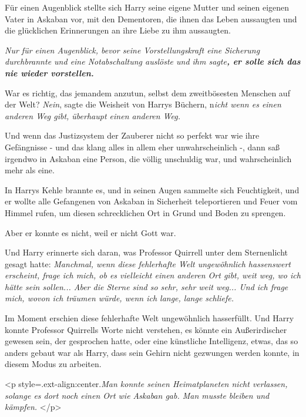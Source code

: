 Für einen Augenblick stellte sich Harry seine eigene Mutter und seinen eigenen
Vater in Askaban vor, mit den Dementoren, die ihnen das Leben aussaugten und die
glücklichen Erinnerungen an ihre Liebe zu ihm aussaugten.

\textbf{} \emph{Nur für einen Augenblick, bevor seine Vorstellungskraft eine
Sicherung durchbrannte und eine Notabschaltung auslöste und ihm
sagte}\textbf{\emph{, er solle sich das nie wieder vorstellen.}}

War es richtig, das jemandem anzutun, selbst dem zweitbösesten Menschen auf der
Welt? \emph{Nein}, sagte die Weisheit von Harrys Büchern, n\emph{icht wenn es
einen anderen Weg gibt, überhaupt einen anderen Weg.}

Und wenn das Justizsystem der Zauberer nicht so perfekt war wie ihre Gefängnisse
- und das klang alles in allem eher unwahrscheinlich -, dann saß irgendwo in
Askaban eine Person, die völlig unschuldig war, und wahrscheinlich mehr als
eine.

In Harrys Kehle brannte es, und in seinen Augen sammelte sich Feuchtigkeit, und
er wollte alle Gefangenen von Askaban in Sicherheit teleportieren und Feuer vom
Himmel rufen, um diesen schrecklichen Ort in Grund und Boden zu sprengen.

Aber er konnte es nicht, weil er nicht Gott war.

Und Harry erinnerte sich daran, was Professor Quirrell unter dem Sternenlicht
gesagt hatte: \emph{Manchmal, wenn diese fehlerhafte Welt ungewöhnlich
hassenswert erscheint, frage ich mich, ob es vielleicht einen anderen Ort gibt,
weit weg, wo ich hätte sein sollen... Aber die Sterne sind so sehr, sehr weit
weg... Und ich frage mich, wovon ich träumen würde, wenn ich lange, lange
schliefe.}

Im Moment erschien diese fehlerhafte Welt ungewöhnlich hasserfüllt. Und Harry
konnte Professor Quirrells Worte nicht verstehen, es könnte ein Außerirdischer
gewesen sein, der gesprochen hatte, oder eine künstliche Intelligenz, etwas, das
so anders gebaut war als Harry, dass sein Gehirn nicht gezwungen werden konnte,
in diesem Modus zu arbeiten.

<p style=\grqq{}.ext-align:center\grqq{}.\emph{Man konnte seinen Heimatplaneten
nicht verlassen, solange es dort noch einen Ort wie Askaban gab. Man musste
bleiben und kämpfen.} </p>

